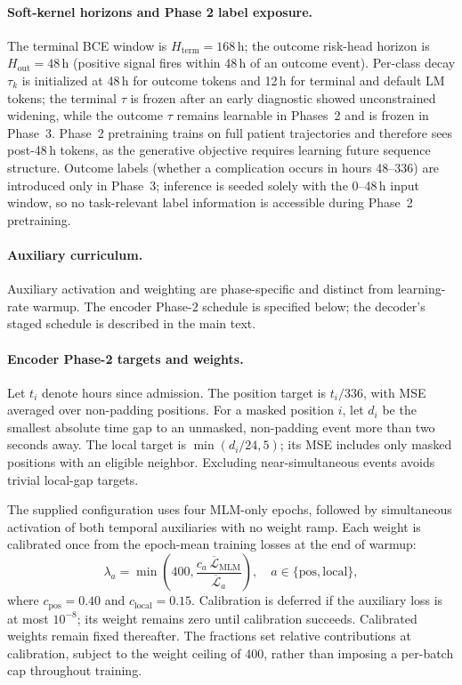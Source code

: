 \paragraph{Soft-kernel horizons and Phase 2 label exposure.}
The terminal BCE window is $H_\text{term}{=}168$\,h; the outcome risk-head horizon is $H_\text{out}{=}48$\,h (positive signal fires within 48\,h of an outcome event). Per-class decay $\tau_k$ is initialized at 48\,h for outcome tokens and 12\,h for terminal and default LM tokens; the terminal $\tau$ is frozen after an early diagnostic showed unconstrained widening, while the outcome $\tau$ remains learnable in Phases~2 and is frozen in Phase~3. Phase~2 pretraining trains on full patient trajectories and therefore sees post-48\,h tokens, as the generative objective requires learning future sequence structure. Outcome labels (whether a complication occurs in hours 48--336) are introduced only in Phase~3; inference is seeded solely with the 0--48\,h input window, so no task-relevant label information is accessible during Phase~2 pretraining.

\paragraph{Auxiliary curriculum.}
Auxiliary activation and weighting are phase-specific and distinct from learning-rate warmup. The encoder Phase-2 schedule is specified below; the decoder's staged schedule is described in the main text.

\paragraph{Encoder Phase-2 targets and weights.}
\label{app:enc-phase2-loss}
Let $t_i$ denote hours since admission. The position target is $t_i/336$, with MSE averaged over non-padding positions. For a masked position $i$, let $d_i$ be the smallest absolute time gap to an unmasked, non-padding event more than two seconds away. The local target is $\min(d_i/24,5)$; its MSE includes only masked positions with an eligible neighbor. Excluding near-simultaneous events avoids trivial local-gap targets.

The supplied configuration uses four MLM-only epochs, followed by simultaneous activation of both temporal auxiliaries with no weight ramp. Each weight is calibrated once from the epoch-mean training losses at the end of warmup:
\begin{equation}
\lambda_a=\min\!\left(400,\frac{c_a\,\overline{\mathcal{L}}_{\mathrm{MLM}}}{\overline{\mathcal{L}}_a}\right),
\quad a\in\{\mathrm{pos},\mathrm{local}\},
\end{equation}
where $c_{\mathrm{pos}}=0.40$ and $c_{\mathrm{local}}=0.15$. Calibration is deferred if the auxiliary loss is at most $10^{-8}$; its weight remains zero until calibration succeeds. Calibrated weights remain fixed thereafter. The fractions set relative contributions at calibration, subject to the weight ceiling of 400, rather than imposing a per-batch cap throughout training.

